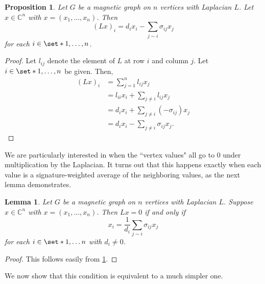 \documentclass[12pt]{article}
\newtheorem{prop}[thm]{Proposition}
\newtheorem{lem}[thm]{Lemma}
\theoremstyle{definition}
\newcommand{\C}{\mathbb C}
\begin{document}
\begin{prop}\label{Laplacian times vector}
Let $G$ be a magnetic graph on $n$ vertices with Laplacian $L$. Let $x \in \C^n$ with $x = (x_1, \dots, x_n)$. Then
$$(Lx)_i = d_ix_i - \sum_{j \sim i} \sigma_{ij} x_j$$
for each $i \in \set*{1, \dots, n}$.
\end{prop}
\begin{proof}
Let $l_{ij}$ denote the element of $L$ at row $i$ and column $j$. Let $i \in \set*{1, \dots, n}$ be given. Then,
\begin{align*}
(Lx)_i &= \sum_{j=1}^n l_{ij}x_j \\
&= l_{ii}x_i + \sum_{j \neq i} l_{ij}x_j \\
&= d_i x_i + \sum_{j \neq i} (-\sigma_{ij})x_j \\
&= d_i x_i - \sum_{j \neq i} \sigma_{ij}x_j.
\end{align*}
\end{proof}

We are particularly interested in when the ``vertex values" all go to 0 under multiplication by the Laplacian. It turns out that this happens exactly when each value is a signature-weighted average of the neighboring values, as the next lemma demonstrates.

\begin{lem}\label{entries of vector in Laplacian's null space are signature-weighted averages}
Let $G$ be a magnetic graph on $n$ vertices with Laplacian $L$. Suppose $x \in \C^n$ with $x = (x_1, \dots, x_n)$. Then $Lx = 0$ if and only if
$$x_i = \frac{1}{d_i} \sum_{j \sim i} \sigma_{ij}x_j$$
for each $i \in \set*{1, \dots n}$ with $d_i \neq 0$.
\end{lem}
\begin{proof}
This follows easily from \cref{Laplacian times vector}.
\end{proof}

We now show that this condition is equivalent to a much simpler one.
\end{document}
